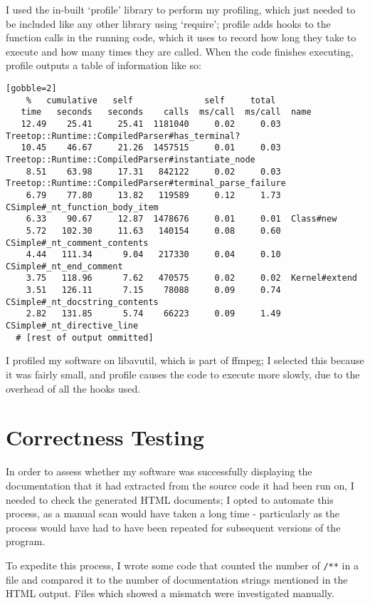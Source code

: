  I used the in-built `profile' library to perform my profiling, which just
  needed to be included like any other library using `require'; profile adds
  hooks to the function calls in the running code, which it uses to record
  how long they take to execute and how many times they are called. When the
  code finishes executing, profile outputs a table of information like so:

  \begin{verbatim}[gobble=2]
    %   cumulative   self              self     total
   time   seconds   seconds    calls  ms/call  ms/call  name
   12.49    25.41     25.41  1181040     0.02     0.03  Treetop::Runtime::CompiledParser#has_terminal?
   10.45    46.67     21.26  1457515     0.01     0.03  Treetop::Runtime::CompiledParser#instantiate_node
    8.51    63.98     17.31   842122     0.02     0.03  Treetop::Runtime::CompiledParser#terminal_parse_failure
    6.79    77.80     13.82   119589     0.12     1.73  CSimple#_nt_function_body_item
    6.33    90.67     12.87  1478676     0.01     0.01  Class#new
    5.72   102.30     11.63   140154     0.08     0.60  CSimple#_nt_comment_contents
    4.44   111.34      9.04   217330     0.04     0.10  CSimple#_nt_end_comment
    3.75   118.96      7.62   470575     0.02     0.02  Kernel#extend
    3.51   126.11      7.15    78088     0.09     0.74  CSimple#_nt_docstring_contents
    2.82   131.85      5.74    66223     0.09     1.49  CSimple#_nt_directive_line
  # [rest of output ommitted]

  \end{verbatim}

  I profiled my software on libavutil, which is part of ffmpeg; I selected
  this because it was fairly small, and profile causes the code to execute
  more slowly, due to the overhead of all the hooks used.

\section{Correctness Testing}

In order to assess whether my software was successfully displaying the
documentation that it had extracted from the source code it had been run on, I
needed to check the generated HTML documents; I opted to automate this process,
as a manual scan would have taken a long time - particularly as the process
would have had to have been repeated for subsequent versions of the program.


To expedite this process, I wrote some code that counted the number of
\lstinline|/**|
in a file and compared it to the number of documentation strings mentioned in
the HTML output. Files which showed a mismatch were investigated manually.

